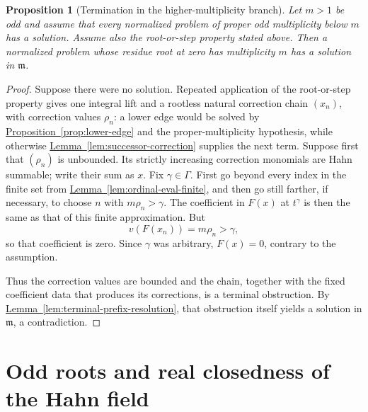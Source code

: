 \documentclass[11pt]{article}
\newcommand{\Val}{v}
\newcommand{\namedref}[2]{\hyperref[#2]{#1~\ref*{#2}}}
\theoremstyle{proofnote}
\newtheorem{proposition}[theorem]{Proposition}
\begin{document}
\begin{proposition}[Termination in the higher-multiplicity branch]
\label{prop:transfinite-termination}
  Let \(m>1\) be odd and assume that every normalized problem of proper odd
  multiplicity below \(m\) has a solution.  Assume also the root-or-step
  property stated above.  Then a normalized problem whose residue root at
  zero has multiplicity \(m\) has a solution in \(\mathfrak m\).
\end{proposition}
\begin{proof}
  Suppose there were no solution.  Repeated application of
  the root-or-step property gives one integral lift and a rootless natural
  correction chain \((x_n)\), with correction values \(\rho_n\): a lower edge would be
  solved by \namedref{Proposition}{prop:lower-edge} and the proper-multiplicity
  hypothesis, while otherwise \namedref{Lemma}{lem:successor-correction}
  supplies the next term.  Suppose
  first that \((\rho_n)\) is unbounded.  Its strictly increasing correction
  monomials are Hahn summable; write their sum as \(x\).  Fix
  \(\gamma\in\Gamma\).  First go beyond every index in the finite set from
  \namedref{Lemma}{lem:ordinal-eval-finite}, and then go still farther, if
  necessary, to choose \(n\) with \(m\rho_n>\gamma\).  The coefficient in
  \(F(x)\) at \(t^\gamma\) is then the same as that of this finite
  approximation.  But
  \[
    \Val(F(x_n))=m\rho_n>\gamma,
  \]
  so that coefficient is zero.  Since \(\gamma\) was arbitrary,
  \(F(x)=0\), contrary to the assumption.

  Thus the correction values are bounded and the chain, together with the
  fixed coefficient data that produces its corrections, is a terminal
  obstruction.  By
  \namedref{Lemma}{lem:terminal-prefix-resolution}, that obstruction itself
  yields a solution in \(\mathfrak m\), a contradiction.
\end{proof}

\section{Odd roots and real closedness of the Hahn field}
\label{sec:hahn-conclusion}
\end{document}
